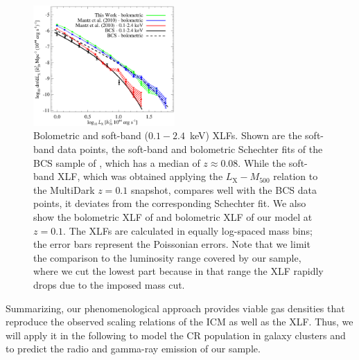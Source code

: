 \documentclass[traditabstract]{aa}
\newcommand{\rmn}{\mathrm}
\begin{document}
\begin{figure}[t]
\centering
\includegraphics[width=0.48\textwidth]{figures/xlf.eps}
\caption{Bolometric and soft-band ($0.1-2.4$~keV) XLFs. Shown are the soft-band
  data points, the soft-band and bolometric Schechter fits of the BCS sample of
  \cite{1997ApJ...479L.101E}, which has a median of $z \approx 0.08$.  While the
  soft-band XLF, which was obtained applying the \cite{2010MNRAS.406.1773M}
  $L_{\rmn{X}}-M_{500}$ relation to the MultiDark $z = 0.1$ snapshot, compares
  well with the BCS data points, it deviates from the corresponding Schechter
  fit. We also show the bolometric XLF of \cite{2010MNRAS.406.1773M} and
  bolometric XLF of our model at $z=0.1$. The XLFs are calculated in equally
  log-spaced mass bins; the error bars represent the Poissonian errors. Note
  that we limit the comparison to the luminosity range covered by our sample,
  where we cut the lowest part because in that range the XLF rapidly drops due
  to the imposed mass cut.  }
\label{fig:XLF}
\end{figure}

Summarizing, our phenomenological approach provides viable gas densities that
reproduce the observed scaling relations of the ICM as well as the XLF. Thus, we
will apply it in the following to model the CR population in galaxy clusters and
to predict the radio and gamma-ray emission of our sample.


\end{document}
